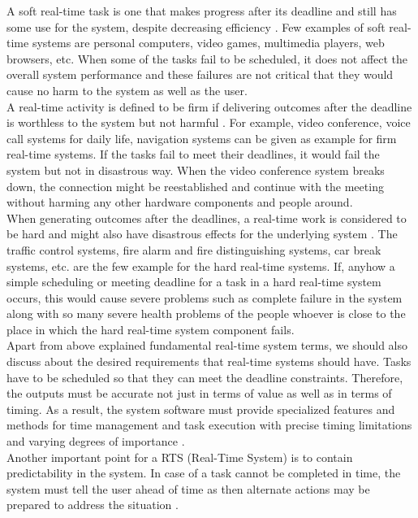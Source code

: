 \documentclass[conference]{IEEEtran}
\begin{document}
A soft real-time task is one that makes progress after its deadline and still has some use for the system, despite decreasing efficiency \cite{hrts}. Few examples of soft real-time systems are personal computers, video games, multimedia players, web browsers, etc. When some of the tasks fail to be scheduled, it does not affect the overall system performance and these failures are not critical that they would cause no harm to the system as well as the user.\\

A real-time activity is defined to be firm if delivering outcomes after the deadline is worthless to the system but not harmful \cite{hrts}. For example, video conference, voice call systems for daily life, navigation systems can be given as example for firm real-time systems. If the tasks fail to meet their deadlines, it would fail the system but not in disastrous way. When the video conference system breaks down, the connection might be reestablished and continue with the meeting without harming any other hardware components and people around.\\

When generating outcomes after the deadlines, a real-time work is considered to be hard and might also have disastrous effects for the underlying system \cite{hrts}. The traffic control systems, fire alarm and fire distinguishing systems, car break systems, etc. are the few example for the hard real-time systems. If, anyhow a simple scheduling or meeting deadline for a task in a hard real-time system occurs, this would cause severe problems such as complete failure in the system along with so many severe health problems of the people whoever is close to the place in which the hard real-time system component fails.  \\

Apart from above explained fundamental real-time system terms, we should also discuss about the desired requirements that real-time systems should have. Tasks have to be scheduled so that they can meet the deadline constraints. Therefore, the outputs must be accurate not just in terms of value as well as in terms of timing. As a result, the system software must provide specialized features and
methods for time management and task execution with precise timing
limitations and varying degrees of importance \cite{hrts}.\\

Another important point for a RTS (Real-Time System) is to contain predictability in the system. In case of a task cannot be completed in time, the system must tell the user ahead of time as then alternate actions may be prepared to address the situation \cite{hrts}. \\
\end{document}
